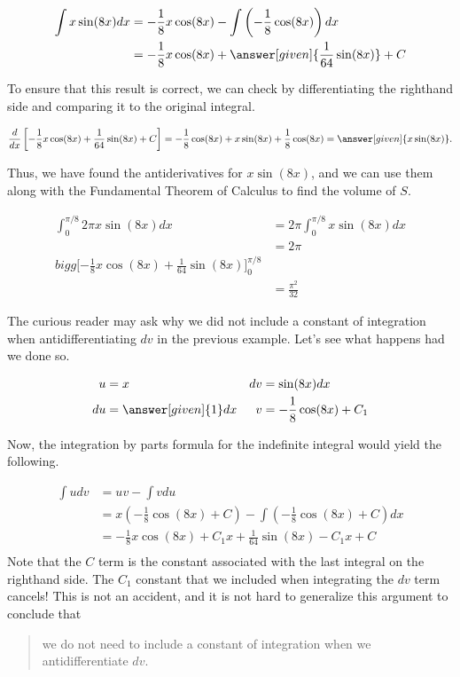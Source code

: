 \documentclass[noauthor]{ximera}
\begin{document}
\begin{model}
\begin{align*}
\int x\sin(8x) dx &=-\frac{1}{8}x\cos(8x) -\int \left(-\frac{1}{8}\cos(8x)\right) dx \\
&=-\frac{1}{8}x\cos(8x) + \answer[given]{\frac{1}{64}\sin(8x)} +C 
\end{align*}

To ensure that this result is correct, we can check by differentiating the righthand side and comparing it to the original integral.

\[
\frac{d}{dx} \left[-\frac{1}{8}x\cos(8x) +\frac{1}{64}\sin(8x) +C \right] = -\frac{1}{8} \cos(8x) +x \sin(8x) +\frac{1}{8} \cos(8x) = \answer[given]{x \sin(8x)}.
\]

Thus, we have found the antiderivatives for $x\sin(8x)$, and we can use them along with the Fundamental Theorem of Calculus to find the volume of $S$.

\begin{align*}
\int_{0}^{\pi/8} 2 \pi x\sin(8x) dx &= 2 \pi \int_{0}^{\pi/8} x\sin(8x) dx \\
&= 2 \pi \\bigg[ -\frac{1}{8}x\cos(8x) + \frac{1}{64}\sin(8x)\bigg]_0^{\pi/8}\\
&=\frac{\pi^{2}}{32}
\end{align*}

\begin{remark}
The curious reader may ask why we did not include a constant of integration when antidifferentiating $dv$ in the previous example.  Let's see what happens had we done so.

\begin{align*}
u &= x & dv & = \sin(8x) dx \\
 du &= \answer[given]{1} dx & v&=-\frac{1}{8}\cos(8x) +C_1
\end{align*}

Now, the integration by parts formula for the indefinite integral would yield the following.

\begin{align*}
\int u dv &= uv -\int v du \\
 &=x \left(-\frac{1}{8}\cos(8x)+C\right) -\int \left(-\frac{1}{8}\cos(8x)+C\right) dx \\
  &=-\frac{1}{8}x\cos(8x)+C_1x + \frac{1}{64}\sin(8x) -C_1x +C \\
\end{align*}
Note that the $C$ term is the constant associated with the last integral on the righthand side.  The $C_1$ constant that we included when integrating the $dv$ term cancels!  This is not an accident, and it is not hard to generalize this argument to conclude that

\begin{quote}
we do not need to include a constant of integration when we antidifferentiate $dv$.
\end{quote}
\end{remark}

\end{model}
\end{document}
